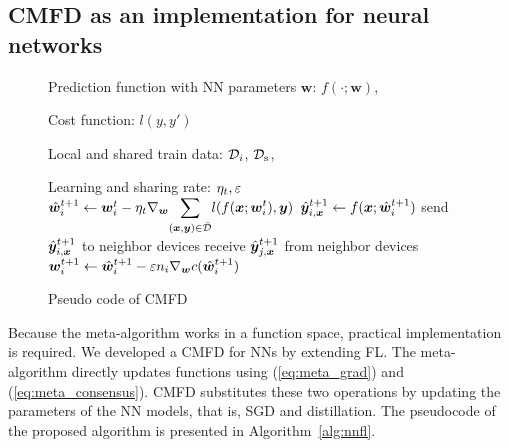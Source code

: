 \documentclass[journal]{IEEEtran}
\begin{document}
\subsection{\gls{CMFD} as an implementation for neural networks} \label{sec:alg_distillation}
\begin{figure}[!t]
  \begin{algorithm}[H]
    \caption{Pseudo code of \gls{CMFD}}
    \label{alg:nnfl}
    \begin{algorithmic}[1]
      \Require Prediction function with \gls{NN} parameters $\bm{w}$: $f(\cdot;\bm{w})$,


               Cost function: $l(y,y')$

               Local and shared train data: $\mathcal{D}_i$, $\mathcal{D}_\mathrm{s}$,

               Learning and sharing rate: $\eta_t, \varepsilon$
           \label{algln:local_sgd_bgn}
            \State ${\hat{\bm{w}}_{i}}^{t+1} \leftarrow \bm{w}_i^t - \eta_t \nabla_{\bm{w}} \displaystyle{\sum_{(\bm{x},\bm{y})\in\hat{\mathcal{D}}}}l(f(\bm{x};\bm{w}_i^t),\bm{y}) $ \label{algln:local_sgd_grad}
          \EndFor \label{algln:local_sgd_end}
           \label{algln:pub_calc_bgn}
            \State ${\hat{\bm{y}}_{i,\bm{x}}}^{t+1} \leftarrow f(\bm{x};{\hat{\bm{w}}_{i}}^{t+1})$
          \EndFor
          \State send ${\hat{\bm{y}}_{i,\bm{x}}}^{t+1}$ to neighbor devices \label{algln:pub_calc_end}
        \EndFor
          \State receive ${\hat{\bm{y}}_{j,\bm{x}}}^{t+1}$ from neighbor devices
            \State $\bm{w}_i^{t+1} \leftarrow {\hat{\bm{w}}_{i}}^{t+1} - \varepsilon n_i \nabla_{\bm{w}} c({\hat{\bm{w}}_{i}}^{t+1})$ \label{algln:distil_end} 
          \EndFor
        \EndFor
      \EndWhile
    \end{algorithmic}
  \end{algorithm}
\end{figure}

Because the meta-algorithm works in a function space, practical implementation is required.
We developed a \gls{CMFD} for \glspl{NN} by extending \gls{FL}.
The meta-algorithm directly updates functions using (\ref{eq:meta_grad}) and (\ref{eq:meta_consensus}).
\Gls{CMFD} substitutes these two operations by updating the parameters of the \gls{NN} models, that is, \gls{SGD} and distillation. 
The pseudocode of the proposed algorithm is presented in Algorithm~\ref{alg:nnfl}.
\end{document}
